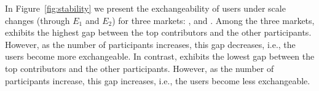 In Figure~\ref{fig:stability} we present the exchangeability of users under scale changes (through $E_1$ and $E_2$) for three  markets: ,  and . Among the three markets,  exhibits the highest gap between the top contributors and the other participants. However, as the number of participants increases, this gap decreases, i.e., the users become more exchangeable. In contrast,  exhibits the lowest gap between the top contributors and the other participants. However, as the number of participants increase, this gap increases, i.e., the users become less exchangeable.




